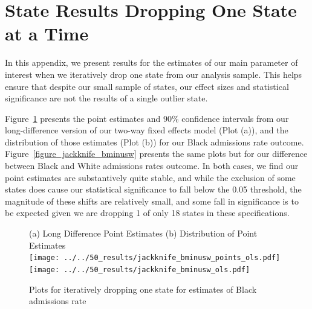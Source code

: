 \documentclass[12pt]{article}
\begin{document}



\clearpage


\section{State Results Dropping One State at a Time}\label{appendix_jackknife}
\setcounter{table}{0}
\setcounter{figure}{0}
\renewcommand{\thetable}{F\arabic{table}}
\renewcommand{\thefigure}{F\arabic{figure}}
\normalsize

In this appendix, we present results for the estimates of our main parameter of interest when we iteratively drop one state from our analysis sample.  This helps ensure that despite our small sample of states, our effect sizes and statistical significance are not the results of a single outlier state.

Figure~\ref{figure_jackknife_black} presents the point estimates and 90\% confidence intervals from our long-difference version of our two-way fixed effects model (Plot (a)), and the distribution of those estimates (Plot (b)) for our Black admissions rate outcome. Figure~\ref{figure_jackknife_bminusw} presents the same plots but for our difference between Black and White admissions rates outcome.  In both cases, we find our point estimates are substantively quite stable, and while the exclusion of some states does cause our statistical significance to fall below the 0.05 threshold, the magnitude of these shifts are relatively small, and some fall in significance is to be expected given we are dropping 1 of only 18 states in these specifications.

\begin{figure}[h!]
 	\begin{center}
 	\caption{ Plots for iteratively dropping one state for estimates of Black admissions rate }
 	\footnotesize
		(a) Long Difference Point Estimates \hspace*{.4in} (b) Distribution of Point Estimates \\
 			\texttt{[image: ../../50\_results/jackknife\_bminusw\_points\_ols.pdf]}
 			\texttt{[image: ../../50\_results/jackknife\_bminusw\_ols.pdf]} \\
       \smallskip
       \label{figure_jackknife_black}
       \end{center}
\end{figure} \normalsize
\end{document}

